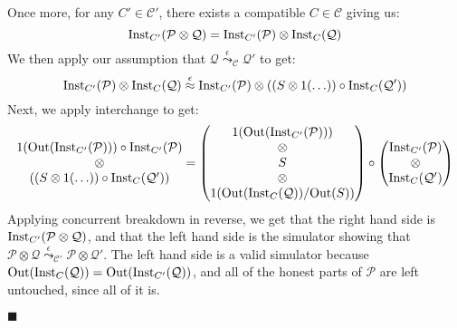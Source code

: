 \begin{theorem}
 Once more, for any $C' \in \mathcal{C}'$, there exists a compatible
$C \in \mathcal{C}$ giving us:
$$
\text{Inst}_{C'}(\mathcal{P} \otimes \mathcal{Q}) =
\text{Inst}_{C'}(\mathcal{P}) \otimes \text{Inst}_C(\mathcal{Q})
$$
We then apply our assumption that $\mathcal{Q} \overset{\epsilon}{\leadsto}_{\mathcal{C}} \mathcal{Q}'$
to get:
$$
\text{Inst}_{C'}(\mathcal{P}) \otimes \text{Inst}_C(\mathcal{Q})
\overset{\epsilon}{\approx}
\text{Inst}_{C'}(\mathcal{P}) \otimes ((S \otimes 1(\ldots)) \circ \text{Inst}_C(\mathcal{Q}'))
$$
Next, we apply interchange to get:
$$
\begin{matrix}
1(\text{Out}(\text{Inst}_{C'}(\mathcal{P}))) \circ \text{Inst}_{C'}(\mathcal{P})\cr
\otimes\cr
((S \otimes 1(\ldots)) \circ \text{Inst}_C(\mathcal{Q}'))
\end{matrix}
=
\begin{pmatrix}
1(\text{Out}(\text{Inst}_{C'}(\mathcal{P})))\cr
\otimes\cr
S\cr
\otimes\cr
1(\text{Out}(\text{Inst}_C(\mathcal{Q})) / \text{Out}(S))
\end{pmatrix}
\circ
\begin{pmatrix}
  \text{Inst}_{C'}(\mathcal{P})\cr
  \otimes\cr
  \text{Inst}_{C}(\mathcal{Q}')
\end{pmatrix}
$$
Applying concurrent breakdown in reverse, we get that the right hand
side is $\text{Inst}_{C'}(\mathcal{P} \otimes \mathcal{Q})$,
and that the left hand side is the simulator showing
that $\mathcal{P} \otimes \mathcal{Q} \overset{\epsilon}{\leadsto}_{\mathcal{C}'} \mathcal{P} \otimes \mathcal{Q}'$.
The left hand side is a valid simulator because
$\text{Out}(\text{Inst}_C(\mathcal{Q})) = \text{Out}(\text{Inst}_{C'}(\mathcal{Q}))$,
and all of the honest parts of $\mathcal{P}$ are left untouched,
since all of it is.

$\blacksquare$
\end{theorem}


